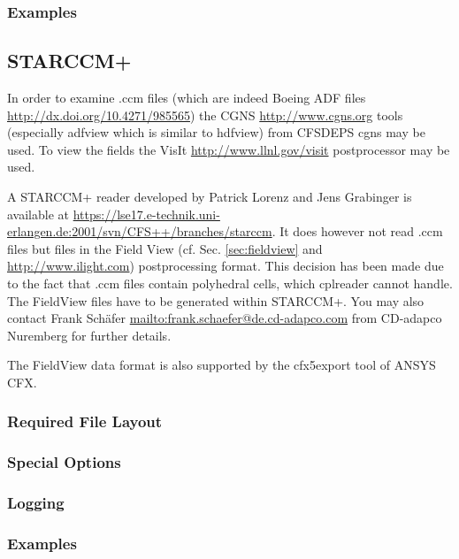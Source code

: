 \documentclass[a4paper,10pt]{article}
\begin{document}
\subsubsection{Examples}


\newpage
\subsection{STARCCM+}
\label{sec:starccm}

In  order  to   examine  .ccm  files  (which  are   indeed  Boeing  ADF  files
\url{http://dx.doi.org/10.4271/985565})   the  CGNS  \url{http://www.cgns.org}
tools (especially adfview  which is similar to hdfview)  from CFSDEPS cgns may
be  used.   To  view  the  fields  the  VisIt  \url{http://www.llnl.gov/visit}
postprocessor may be used.

A STARCCM+ reader developed by  Patrick Lorenz and Jens Grabinger is available
at
\url{https://lse17.e-technik.uni-erlangen.de:2001/svn/CFS++/branches/starccm}.
It  does   however  not  read  .ccm   files  but  files  in   the  Field  View
(cf. Sec.  \ref{sec:fieldview} and \url{http://www.ilight.com}) postprocessing
format.  This decision  has been made due to the fact  that .ccm files contain
polyhedral cells, which  cplreader cannot handle. The FieldView  files have to
be   generated  within   STARCCM+.  You   may  also   contact   Frank  Schäfer
\url{mailto:frank.schaefer@de.cd-adapco.com}  from   CD-adapco  Nuremberg  for
further details.

The FieldView  data format is also  supported by the cfx5export  tool of ANSYS
CFX.

\subsubsection{Required File Layout}

\subsubsection{Special Options}

\subsubsection{Logging} 

\subsubsection{Examples}
\end{document}
